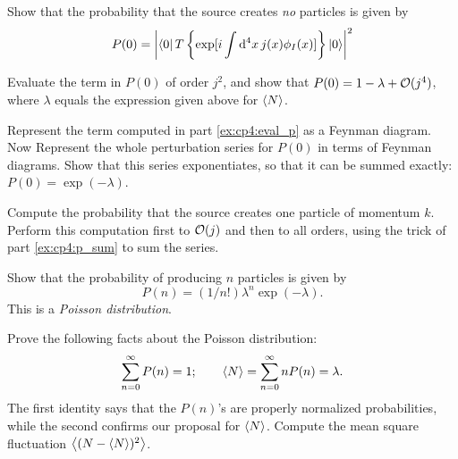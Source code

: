 \begin{problembody}
    \item Show that the probability that the source creates \textit{no} particles is 
    given by 
    \begin{equation*}
        P(0) = \left| 
            \left\langle 0\right| T\left\{
                \exp[
                    i\int \mathrm{d}^4x \, j(x) \phi_I(x)
                ]    
            \right\}\left|0\right\rangle
         \right|^2
    \end{equation*}

    \item\label{ex:cp4:eval_p} Evaluate the term in $P(0)$ of order $j^2$, and show that $P(0) = 1 - \lambda + \mathcal{O}(j^4)$,
    where $\lambda$ equals the expression given above for $\left\langle N \right\rangle$.

    \item\label{ex:cp4:p_sum} Represent the term computed in part \ref{ex:cp4:eval_p} as a Feynman diagram. Now Represent
    the whole perturbation series for $P(0)$ in terms of Feynman diagrams. Show that this series
    exponentiates, so that it can be summed exactly: $P(0) = \exp(-\lambda)$.

    \item Compute the probability that the source creates one particle of momentum $k$.
    Perform this computation first to $\mathcal{O}(j)$ and then to all orders, using the trick of part \ref{ex:cp4:p_sum} to sum
    the series.

    \item Show that the probability of producing $n$ particles is given by 
    \begin{equation*}
        P(n) = (1 / n!)\lambda^n \exp(-\lambda).
    \end{equation*}
    This is a \textit{Poisson distribution}.

    \item Prove the following facts about the Poisson distribution:
    \begin{equation*}
        \sum_{n = 0}^\infty P(n) = 1; 
        \qquad \left\langle N \right\rangle = \sum_{n = 0}^\infty n P(n) = \lambda.
    \end{equation*}
    The first identity says that the $P(n)$'s are properly normalized probabilities, while the second confirms our proposal
    for $\left\langle N \right\rangle$. Compute the mean square fluctuation $\left\langle (N - \left\langle N \right\rangle)^2 \right\rangle$.
\end{problembody}

